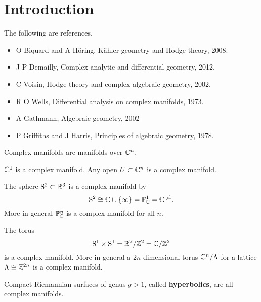 \def\module{M4P57 Complex Manifolds}
\def\lecturer{Prof Paolo Cascini}
\def\term{Spring 2020}
\def\cover{}
\def\syllabus{}
\def\thm{section}







\setcounter{section}{0}

\section{Introduction}


The following are references.
\begin{itemize}
\item O Biquard and A H\"oring, K\"ahler geometry and Hodge theory, 2008.
\item J P Demailly, Complex analytic and differential geometry, 2012.
\item C Voisin, Hodge theory and complex algebraic geometry, 2002.
\item R O Wells, Differential analysis on complex manifolds, 1973.
\item A Gathmann, Algebraic geometry, 2002
\item P Griffiths and J Harris, Principles of algebraic geometry, 1978.
\end{itemize}

Complex manifolds are manifolds over $ \mathbb{C}^n $.

\begin{example}
$ \mathbb{C}^1 $ is a complex manifold. Any open $ U \subset \mathbb{C}^n $ is a complex manifold.
\end{example}

\begin{example}
The sphere $ \mathrm{S}^2 \subset \mathbb{R}^3 $ is a complex manifold by
$$ \S^2 \cong \CC \cup \cbr{\infty} = \PP_\CC^1 = \CP^1. $$
More in general $ \mathbb{P}_{\mathbb{C}}^n $ is a complex manifold for all $ n $.
\end{example}

\begin{example}
The torus
$$ \mathrm{S}^1 \times \mathrm{S}^1 = \mathbb{R}^2 / \mathbb{Z}^2 = \mathbb{C} / \mathbb{Z}^2 $$
is a complex manifold. More in general a $ 2n $-dimensional torus $ \mathbb{C}^n / \Lambda $ for a lattice $ \Lambda \cong \mathbb{Z}^{2n} $ is a complex manifold.
\end{example}

\begin{example}
Compact Riemannian surfaces of genus $ g > 1 $, called \textbf{hyperbolics}, are all complex manifolds.
\end{example}

